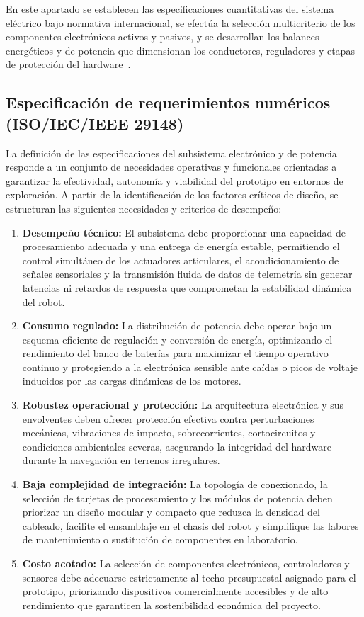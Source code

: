 En este apartado se establecen las especificaciones cuantitativas del sistema eléctrico bajo normativa internacional, se efectúa la selección multicriterio de los componentes electrónicos activos y pasivos, y se desarrollan los balances energéticos y de potencia que dimensionan los conductores, reguladores y etapas de protección del hardware~\cite{Reumann2012}.

\subsection{Especificación de requerimientos numéricos (ISO/IEC/IEEE 29148)}


La definición de las especificaciones del subsistema electrónico y de potencia responde a un conjunto de necesidades operativas y funcionales orientadas a garantizar la efectividad, autonomía y viabilidad del prototipo en entornos de exploración. A partir de la identificación de los factores críticos de diseño, se estructuran las siguientes necesidades y criterios de desempeño:

\begin{enumerate}
    \item \textbf{Desempeño técnico:} El subsistema debe proporcionar una capacidad de procesamiento adecuada y una entrega de energía estable, permitiendo el control simultáneo de los actuadores articulares, el acondicionamiento de señales sensoriales y la transmisión fluida de datos de telemetría sin generar latencias ni retardos de respuesta que comprometan la estabilidad dinámica del robot.
    \item \textbf{Consumo regulado:} La distribución de potencia debe operar bajo un esquema eficiente de regulación y conversión de energía, optimizando el rendimiento del banco de baterías para maximizar el tiempo operativo continuo y protegiendo a la electrónica sensible ante caídas o picos de voltaje inducidos por las cargas dinámicas de los motores.
    \item \textbf{Robustez operacional y protección:} La arquitectura electrónica y sus envolventes deben ofrecer protección efectiva contra perturbaciones mecánicas, vibraciones de impacto, sobrecorrientes, cortocircuitos y condiciones ambientales severas, asegurando la integridad del hardware durante la navegación en terrenos irregulares.
    \item \textbf{Baja complejidad de integración:} La topología de conexionado, la selección de tarjetas de procesamiento y los módulos de potencia deben priorizar un diseño modular y compacto que reduzca la densidad del cableado, facilite el ensamblaje en el chasis del robot y simplifique las labores de mantenimiento o sustitución de componentes en laboratorio.
    \item \textbf{Costo acotado:} La selección de componentes electrónicos, controladores y sensores debe adecuarse estrictamente al techo presupuestal asignado para el prototipo, priorizando dispositivos comercialmente accesibles y de alto rendimiento que garanticen la sostenibilidad económica del proyecto.
\end{enumerate}

